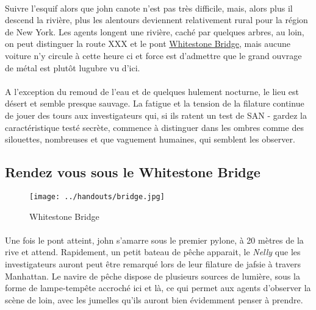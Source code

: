 
\paragraph{} Suivre l'esquif alors que \gls{john} canote n'est pas très difficile, mais, alors plus il descend la rivière, plus les alentours deviennent 
relativement rural pour la région de New York. Les agents longent une rivière, caché par quelques arbres, au loin, on peut distinguer la route XXX
et le pont \href{http://en.wikipedia.org/wiki/Bronx–Whitestone\_Bridge}{Whitestone Bridge}, mais aucune voiture n'y circule à cette heure ci et 
force est d'admettre que le grand ouvrage de métal est plutôt lugubre vu d'ici.

\paragraph{} A l'exception du remoud de l'eau et de quelques hulement nocturne, le lieu est désert et semble presque sauvage. La fatigue et la 
tension de la filature continue de jouer des tours aux investigateurs qui, si ils ratent un test de SAN - gardez la caractéristique testé secrète, commence à
distinguer dans les ombres comme des silouettes, nombreuses et que vaguement humaines, qui semblent les observer.

\subsection{Rendez vous sous le Whitestone Bridge}


\begin{wrapfigure}{r}{65mm}
\begin{center}
 \texttt{[image: ../handouts/bridge.jpg]}
\end{center}
\caption{Whitestone Bridge}
\end{wrapfigure}

\paragraph{} Une fois le pont atteint, \gls{john} s'amarre sous le premier pylone, à 20 mètres de la rive et attend. Rapidement, un petit bateau 
de pêche apparait, le \emph{Nelly} que les investigateurs auront peut être remarqué lors de leur filature de \gls{jafsie} à travers Manhattan. Le
navire de pêche dispose de plusieurs sources de lumière, sous la forme de lampe-tempête accroché ici et là, ce qui permet aux agents d'observer la
scène de loin, avec les jumelles qu'ils auront bien évidemment penser à prendre.

